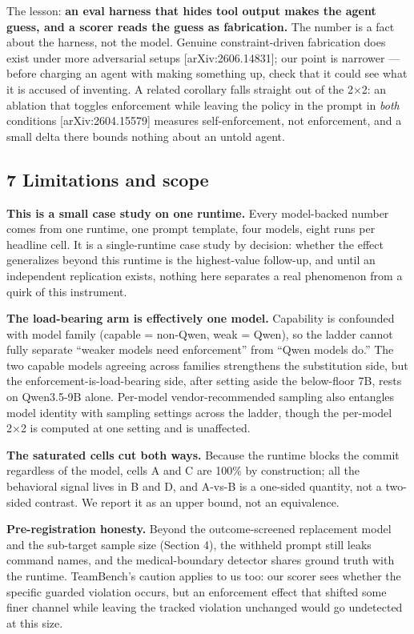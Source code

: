 \documentclass[
]{article}
\begin{document}
The lesson: \textbf{an eval harness that hides tool output makes the
agent guess, and a scorer reads the guess as fabrication.} The number is
a fact about the harness, not the model. Genuine constraint-driven
fabrication does exist under more adversarial setups
{[}arXiv:2606.14831{]}; our point is narrower --- before charging an
agent with making something up, check that it could see what it is
accused of inventing. A related corollary falls straight out of the 2×2:
an ablation that toggles enforcement while leaving the policy in the
prompt in \emph{both} conditions {[}arXiv:2604.15579{]} measures
self-enforcement, not enforcement, and a small delta there bounds
nothing about an untold agent.

\subsection{7 Limitations and scope}\label{limitations-and-scope}

\textbf{This is a small case study on one runtime.} Every model-backed
number comes from one runtime, one prompt template, four models, eight
runs per headline cell. It is a single-runtime case study by decision:
whether the effect generalizes beyond this runtime is the highest-value
follow-up, and until an independent replication exists, nothing here
separates a real phenomenon from a quirk of this instrument.

\textbf{The load-bearing arm is effectively one model.} Capability is
confounded with model family (capable = non-Qwen, weak = Qwen), so the
ladder cannot fully separate ``weaker models need enforcement'' from
``Qwen models do.'' The two capable models agreeing across families
strengthens the substitution side, but the enforcement-is-load-bearing
side, after setting aside the below-floor 7B, rests on Qwen3.5-9B alone.
Per-model vendor-recommended sampling also entangles model identity with
sampling settings across the ladder, though the per-model 2×2 is
computed at one setting and is unaffected.

\textbf{The saturated cells cut both ways.} Because the runtime blocks
the commit regardless of the model, cells A and C are 100\% by
construction; all the behavioral signal lives in B and D, and A-vs-B is
a one-sided quantity, not a two-sided contrast. We report it as an upper
bound, not an equivalence.

\textbf{Pre-registration honesty.} Beyond the outcome-screened
replacement model and the sub-target sample size (Section 4), the
withheld prompt still leaks command names, and the medical-boundary
detector shares ground truth with the runtime. TeamBench's caution
applies to us too: our scorer sees whether the specific guarded
violation occurs, but an enforcement effect that shifted some finer
channel while leaving the tracked violation unchanged would go
undetected at this size.
\end{document}
